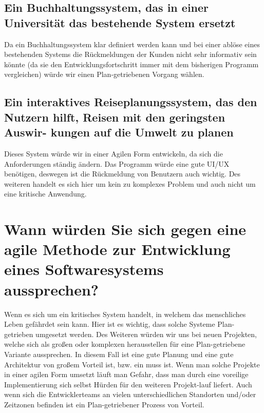 \documentclass[12pt]{article}
\begin{document}
\subsection{Ein Buchhaltungssystem, das in einer Universität das bestehende System ersetzt}
Da ein Buchhaltungssystem klar definiert werden kann und bei einer ablöse eines bestehenden Systems die Rückmeldungen der Kunden nicht sehr informativ sein könnte (da sie den Entwicklungsfortschritt immer mit dem bisherigen Programm vergleichen) würde wir einen Plan-getriebenen Vorgang wählen.
\subsection{Ein interaktives Reiseplanungssystem, das den Nutzern hilft, Reisen mit den geringsten Auswir-
kungen auf die Umwelt zu planen}
Dieses System würde wir in einer Agilen Form entwickeln, da sich die Anforderungen ständig ändern. Das Programm würde eine gute UI/UX benötigen, deswegen ist die Rückmeldung von Benutzern auch wichtig. Des weiteren handelt es sich hier um kein zu komplexes Problem und auch nicht um eine kritische Anwendung.
\section{Wann würden Sie sich gegen eine agile Methode zur Entwicklung eines Softwaresystems aussprechen?}
Wenn es sich um ein kritisches System handelt, in welchem das menschliches Leben gefährdet sein kann. Hier ist es wichtig, dass solche Systeme Plan-getrieben umgesetzt werden.
Des Weiteren würden wir uns bei neuen Projekten, welche sich als großen oder komplexen herausstellen für eine Plan-getriebene Variante aussprechen. In diesem Fall ist eine gute Planung und eine gute Architektur von großem Vorteil ist, bzw. ein muss ist. Wenn man solche Projekte in einer agilen Form umsetzt läuft man Gefahr, dass man durch eine voreilige Implementierung sich selbst Hürden für den weiteren Projekt-lauf liefert. Auch wenn sich die Entwicklerteams an vielen unterschiedlichen Standorten und/oder Zeitzonen befinden ist ein Plan-getriebener Prozess von Vorteil.
\end{document}
